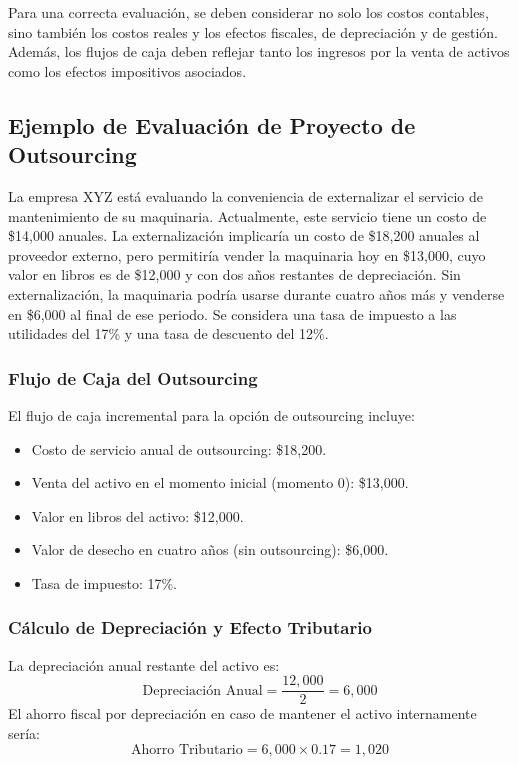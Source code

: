 \documentclass{templateNote}
\begin{document}
Para una correcta evaluación, se deben considerar no solo los costos contables, sino también los costos reales y los efectos fiscales, de depreciación y de gestión. Además, los flujos de caja deben reflejar tanto los ingresos por la venta de activos como los efectos impositivos asociados.

\subsection*{Ejemplo de Evaluación de Proyecto de Outsourcing}

La empresa XYZ está evaluando la conveniencia de externalizar el servicio de mantenimiento de su maquinaria. Actualmente, este servicio tiene un costo de \$14,000 anuales. La externalización implicaría un costo de \$18,200 anuales al proveedor externo, pero permitiría vender la maquinaria hoy en \$13,000, cuyo valor en libros es de \$12,000 y con dos años restantes de depreciación. Sin externalización, la maquinaria podría usarse durante cuatro años más y venderse en \$6,000 al final de ese periodo. Se considera una tasa de impuesto a las utilidades del 17\% y una tasa de descuento del 12\%.

\subsubsection*{Flujo de Caja del Outsourcing}

El flujo de caja incremental para la opción de outsourcing incluye:

\begin{itemize}
    \item Costo de servicio anual de outsourcing: \$18,200.
    \item Venta del activo en el momento inicial (momento 0): \$13,000.
    \item Valor en libros del activo: \$12,000.
    \item Valor de desecho en cuatro años (sin outsourcing): \$6,000.
    \item Tasa de impuesto: 17\%.
\end{itemize}

\subsubsection*{Cálculo de Depreciación y Efecto Tributario}

La depreciación anual restante del activo es:
\[
\text{Depreciación Anual} = \frac{12,000}{2} = 6,000
\]
El ahorro fiscal por depreciación en caso de mantener el activo internamente sería:
\[
\text{Ahorro Tributario} = 6,000 \times 0.17 = 1,020
\]
\end{document}
